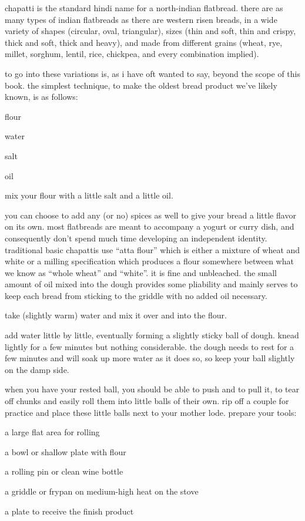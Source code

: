 chapatti is the standard hindi name for a north-indian flatbread. there are as 
many types of indian flatbreads as there are western risen breads, in a wide 
variety of shapes (circular, oval, triangular), sizes (thin and soft, thin and 
crispy, thick and soft, thick and heavy), and made from different grains 
(wheat, rye, millet, sorghum, lentil, rice, chickpea, and every combination 
implied).

to go into these variations is, as i have oft wanted to say, beyond the scope 
of this book. the simplest technique, to make the oldest bread product we've 
likely known, is as follows:

\begin{ingredients}
  \item flour
  \item water
  \item salt
  \item oil
\end{ingredients}

mix your flour with a little salt and a little oil.

you can choose to add any (or no) spices as well to give your bread a little 
flavor on its own. most flatbreads are meant to accompany a yogurt or curry 
dish, and consequently don't spend much time developing an independent 
identity. traditional basic chapattis use ``atta flour'' which is either a 
mixture of wheat and white or a milling specification which produces a flour 
somewhere between what we know as ``whole wheat'' and ``white''. it is fine and 
unbleached. the small amount of oil mixed into the dough provides some 
pliability and mainly serves to keep each bread from sticking to the griddle 
with no added oil necessary.

take (slightly warm) water and mix it over and into the flour.

add water little by little, eventually forming a slightly sticky ball of dough. 
knead lightly for a few minutes but nothing considerable. the dough needs to 
rest for a few minutes and will soak up more water as it does so, so keep your 
ball slightly on the damp side.

when you have your rested ball, you should be able to push and to pull it, to 
tear off chunks and easily roll them into little balls of their own. rip off a 
couple for practice and place these little balls next to your mother lode. 
prepare your tools:

\begin{ingredients}
  \item a large flat area for rolling
  \item a bowl or shallow plate with flour
  \item a rolling pin or clean wine bottle
  \item a griddle or frypan on medium-high heat on the stove
  \item a plate to receive the finish product
\end{ingredients}

